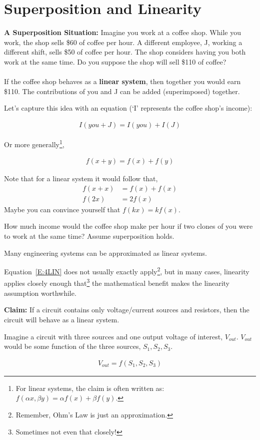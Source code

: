\section{Superposition and Linearity}
\textbf{A Superposition Situation:} Imagine you work at a coffee shop. While you work, the shop sells \$60 of coffee per hour. A different employee, J, working a different shift, sells \$50 of coffee per hour. The shop considers having you both work at the same time. Do you suppose the shop will sell \$110 of coffee?\\
\\
If the coffee shop behaves as a \textbf{linear system}, then together you would earn \$110. The contributions of you and J can be added (superimposed) together.
\par
Let's capture this idea with an equation (`I' represents the coffee shop's income):

\begin{align*}
I(you+J) = I(you)+I(J)
\end{align*}

Or more generally\footnote{For linear systems, the claim is often written as: $f(\alpha x,\beta y) = \alpha f(x)+\beta f(y)$.},

\begin{align}
f(x+y) = f(x)+f(y) \label{E:4LIN}
\end{align}

Note that for a linear system it would follow that, 
\begin{align*}
f(x+x) &= f(x)+f(x) \\
f(2x)&=2f(x)
\end{align*}
Maybe you can convince yourself that $f(kx)=kf(x)$.\par

\begin{alevel}
How much income would the coffee shop make per hour if two clones of you were to work at the same time? Assume superposition holds.
\end{alevel}

\begin{bigidea} Many engineering systems can be approximated as linear systems.
\end{bigidea}

Equation~\eqref{E:4LIN} does not usually exactly apply\footnote{Remember, Ohm's Law is just an approximation.}, but in many cases, linearity applies closely enough that\footnote{Sometimes not even that closely!} the mathematical benefit makes the linearity assumption worthwhile.
\par
\textbf{Claim:} If a circuit contains only voltage/current sources and resistors, then the circuit will behave as a linear system. \par
Imagine a circuit with three sources and one output voltage of interest, $V_{out}$. $V_{out}$ would be some function of the three sources, $S_1,S_2,S_3$.
\par
\begin{align}
V_{out} = f(S_1,S_2,S_3)
\end{align}

